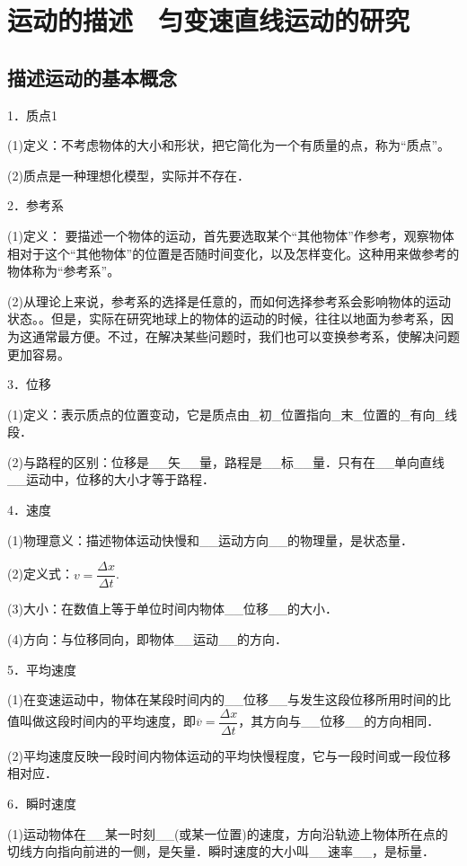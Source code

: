 \chapter{运动的描述　匀变速直线运动的研究}
\section{描述运动的基本概念}





1．质点1

(1)定义：不考虑物体的大小和形状，把它简化为一个有质量的点，称为“质点”。

(2)质点是一种理想化模型，实际并不存在．

2．参考系

(1)定义： 要描述一个物体的运动，首先要选取某个“其他物体”作参考，观察物体相对于这个“其他物体”的位置是否随时间变化，以及怎样变化。这种用来做参考的物体称为“参考系”。

(2)从理论上来说，参考系的选择是任意的，而如何选择参考系会影响物体的运动状态。。但是，实际在研究地球上的物体的运动的时候，往往以地面为参考系，因为这通常最方便。不过，在解决某些问题时，我们也可以变换参考系，使解决问题更加容易。

3．位移

(1)定义：表示质点的位置变动，它是质点由\_初\_位置指向\_末\_位置的\_有向\_线段．

(2)与路程的区别：位移是\_\_矢\_\_量，路程是\_\_标\_\_量．只有在\_\_单向直线\_\_运动中，位移的大小才等于路程．

4．速度

(1)物理意义：描述物体运动快慢和\_\_运动方向\_\_的物理量，是状态量．

(2)定义式：$v=\dfrac{\Delta x}{\Delta t}$.

(3)大小：在数值上等于单位时间内物体\_\_位移\_\_的大小．

(4)方向：与位移同向，即物体\_\_运动\_\_的方向．

5．平均速度

(1)在变速运动中，物体在某段时间内的\_\_位移\_\_与发生这段位移所用时间的比值叫做这段时间内的平均速度，即$\overline{v}=\dfrac{\Delta x}{\Delta t}$，其方向与\_\_位移\_\_的方向相同．

(2)平均速度反映一段时间内物体运动的平均快慢程度，它与一段时间或一段位移相对应．

6．瞬时速度

(1)运动物体在\_\_某一时刻\_\_(或某一位置)的速度，方向沿轨迹上物体所在点的切线方向指向前进的一侧，是矢量．瞬时速度的大小叫\_\_速率\_\_，是标量．

